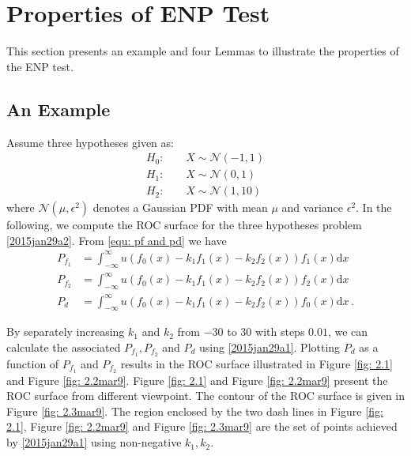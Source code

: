 
\section{Properties of ENP Test}
This section presents an example and four Lemmas to illustrate the properties of the ENP test. 
\subsection{An Example}
Assume three hypotheses given as:
\begin{equation}
  \label{2015jan29a2}
\begin{split}
H_0:\;\;\;\;&X \sim \mathcal{N}(-1, 1)\\
H_1:\;\;\;\;&X \sim \mathcal{N}(0, 1)\\
H_2:\;\;\;\;&X \sim \mathcal{N}(1, 10)
\end{split}
\end{equation}
where $\mathcal{N}(\mu, \epsilon^2)$ denotes a Gaussian PDF with mean $\mu$ and variance $\epsilon^2$. In the following, we compute the ROC surface for the three hypotheses problem \eqref{2015jan29a2}.  
From \eqref{equ: pf and pd} we have  
\begin{equation}
  \begin{split}
	P_{f_1} &= \int_{-\infty}^{\infty}u(f_0(x) - k_1f_1(x) -k_2f_2(x))f_1(x)\mathrm{d}x\\
	P_{f_2} &= \int_{-\infty}^{\infty}u(f_0(x) - k_1f_1(x) -k_2f_2(x))f_2(x)\mathrm{d}x\\
	P_d     &= \int_{-\infty}^{\infty}u(f_0(x) - k_1f_1(x) -k_2f_2(x))f_0(x)\mathrm{d}x\,.
  \end{split}
  \label{2015jan29a1}
\end{equation}

By separately increasing $k_1$ and $k_2$ from $-30$ to $30$ with steps $0.01$, we can calculate the associated $P_{f_1}, P_{f_2}$ and $P_d$ using \eqref{2015jan29a1}. 
Plotting $P_d$ as a function of $P_{f_1}$ and $P_{f_2}$ results in the ROC surface illustrated in Figure \ref{fig: 2.1} and Figure \ref{fig: 2.2mar9}. Figure \ref{fig: 2.1} and Figure \ref{fig: 2.2mar9} present the ROC surface from different viewpoint. The contour of the ROC surface is given in Figure \ref{fig: 2.3mar9}. The region enclosed by the two dash lines in Figure \ref{fig: 2.1}, Figure \ref{fig: 2.2mar9} and Figure \ref{fig: 2.3mar9} are the set of points 
achieved by \eqref{2015jan29a1} using non-negative $k_1, k_2$.

